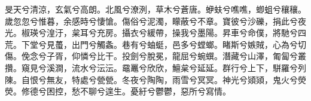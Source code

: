 
\begin{pinyinscope}
旻天兮清涼，玄氣兮高朗。北風兮潦洌，草木兮蒼唐。蛜蚨兮噍噍，蝍蛆兮穰穰。歲忽忽兮惟暮，余感時兮悽愴。傷俗兮泥濁，矇蔽兮不章。寶彼兮沙礫，捐此兮夜光。椒瑛兮湟汙，枲耳兮充房。攝衣兮緩帶，操我兮墨陽。昇車兮命僕，將馳兮四荒。下堂兮見蠆，出門兮觸螽。巷有兮蚰蜓，邑多兮螳螂。睹斯兮嫉賊，心為兮切傷。俛念兮子胥，仰憐兮比干。投劍兮脫冕，龍屈兮蜿蟤。潛藏兮山澤，匍匐兮叢攢。窺見兮溪澗，流水兮沄沄。黿鼉兮欣欣，鱣枲兮延延。群行兮上下，駢羅兮列陳。自恨兮無友，特處兮甇甇。冬夜兮陶陶，雨雪兮冥冥。神光兮熲熲，鬼火兮熒熒。修德兮困控，愁不聊兮遑生。憂紆兮鬱鬱，惡所兮寫情。


\end{pinyinscope}
